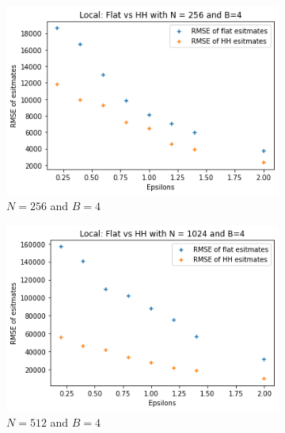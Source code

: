 \documentclass[11pt]{article}
\theoremstyle{definition}
\begin{document}
\begin{figure}[H]
\centering
\begin{subfigure}{.3\textwidth}
  \centering
  \includegraphics[width=\linewidth]{figures/local_hh_flat/hh_beat_flat=256_B=4.png}
  \caption{$N=256$ and $B=4$}
  \label{fig:loc256}
\end{subfigure}%
\begin{subfigure}{.3\textwidth}
  \centering
  \includegraphics[width=\linewidth]{figures/local_hh_flat/hh_beat_flat=1024_B=4.png}
  \caption{$N=512$ and $B=4$}
  \label{fig:loc1024}
\end{subfigure}%
\begin{subfigure}{.3\textwidth}
  \centering

\end{subfigure}
\end{figure}
\end{document}
